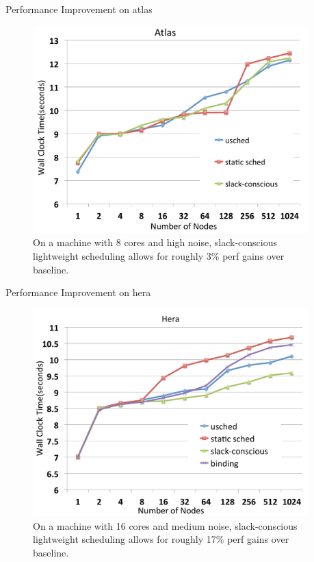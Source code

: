 \documentclass[serif,mathserif,final]{beamer}
\begin{document}
\begin{frame}{}
\begin{columns}[t]
\begin{column}{0.27\linewidth}
\end{column}%


\begin{column}{0.27\linewidth} 
  \begin{block}{\small Performance Improvement on atlas} 
    \begin{figure}[htb] 
      \centering 
      \includegraphics[width=.65\columnwidth]{images/AMG-scaling-atlas}
      \caption{\small On a machine with 8 cores and high noise, slack-conscious lightweight scheduling allows for roughly 3\% perf gains over baseline.} 
    \end{figure} 
  \end{block} 

  \begin{block}{\small Performance Improvement on hera} 
    \begin{figure}[htb] 
      \centering
      \includegraphics[width=.65\columnwidth]{images/AMG-scaling-hera} 
      \caption{ \small On a machine with 16 cores and medium noise, slack-conscious lightweight scheduling allows for roughly 17\% perf gains over baseline.} 
    \end{figure} 
  \end{block}


\end{column}
\end{columns}
\end{frame}
\end{document}

